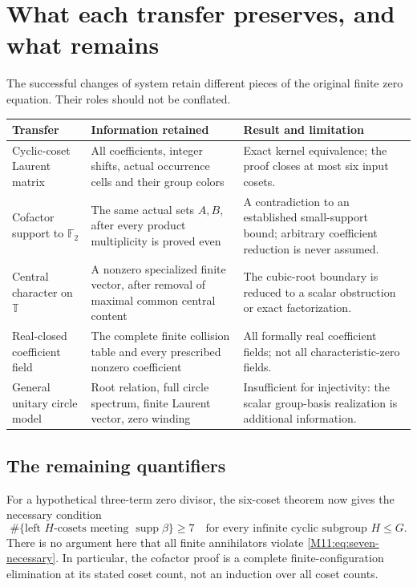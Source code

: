 \documentclass[11pt,a4paper,oneside]{report}
\theoremstyle{definition}
\theoremstyle{remark}
\DeclareMathOperator{\supp}{supp}
\newcommand{\T}{\mathbb T}
\begin{document}
\section{What each transfer preserves, and what remains}

The successful changes of system retain different pieces of the
original finite zero equation. Their roles should not be conflated.

\begin{center}
\small
\begin{tabular}{@{}>{\raggedright\arraybackslash}p{.20\linewidth}
                  >{\raggedright\arraybackslash}p{.36\linewidth}
                  >{\raggedright\arraybackslash}p{.35\linewidth}@{}}
\toprule
Transfer & Information retained & Result and limitation\\
\midrule
Cyclic-coset Laurent matrix & All coefficients, integer shifts,
actual occurrence cells and their group colors & Exact kernel
equivalence; the proof closes at most six input cosets.\\[4pt]
Cofactor support to $\mathbb F_2$ & The same actual sets $A,B$,
after every product multiplicity is proved even & A contradiction
to an established small-support bound; arbitrary coefficient
reduction is never assumed.\\[4pt]
Central character on $\T$ & A nonzero specialized finite vector,
after removal of maximal common central content & The cubic-root
boundary is reduced to a scalar obstruction or exact factorization.\\[4pt]
Real-closed coefficient field & The complete finite collision table
and every prescribed nonzero coefficient & All formally real
coefficient fields; not all characteristic-zero fields.\\[4pt]
General unitary circle model & Root relation, full circle spectrum,
finite Laurent vector, zero winding & Insufficient for injectivity:
the scalar group-basis realization is additional information.\\
\bottomrule
\end{tabular}
\end{center}

\subsection{The remaining quantifiers}

For a hypothetical three-term zero divisor, the six-coset theorem
now gives the necessary condition
\begin{equation}\label{M11:eq:seven-necessary}
 \#\{\text{left }H\text{-cosets meeting }\supp\beta\}\ge7
 \quad\text{for every infinite cyclic subgroup }H\le G.
\end{equation}
There is no argument here that all finite annihilators violate
\eqref{M11:eq:seven-necessary}. In particular, the cofactor proof is a
complete finite-configuration elimination at its stated coset count,
not an induction over all coset counts.
\end{document}
